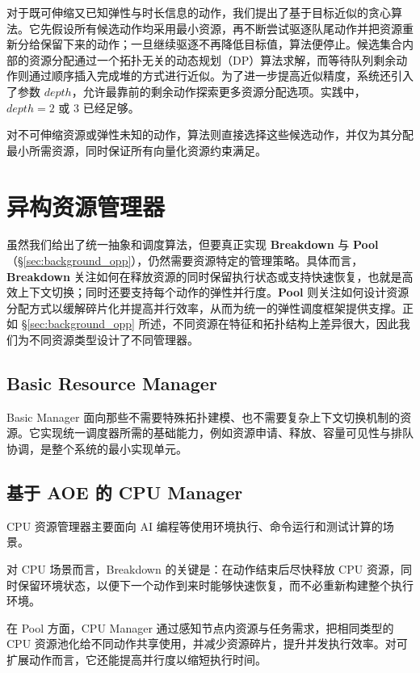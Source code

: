对于既可伸缩又已知弹性与时长信息的动作，我们提出了基于目标近似的贪心算法。它先假设所有候选动作均采用最小资源，再不断尝试驱逐队尾动作并把资源重新分给保留下来的动作；一旦继续驱逐不再降低目标值，算法便停止。候选集合内部的资源分配通过一个拓扑无关的动态规划（DP）算法求解，而等待队列剩余动作则通过顺序插入完成堆的方式进行近似。为了进一步提高近似精度，系统还引入了参数 $depth$，允许最靠前的剩余动作探索更多资源分配选项。实践中，$depth=2$ 或 $3$ 已经足够。

对不可伸缩资源或弹性未知的动作，算法则直接选择这些候选动作，并仅为其分配最小所需资源，同时保证所有向量化资源约束满足。

\section{异构资源管理器}
\label{sec:design_resource_managing}

虽然我们给出了统一抽象和调度算法，但要真正实现 \textbf{Breakdown} 与 \textbf{Pool}（\S\ref{sec:background_opp}），仍然需要资源特定的管理策略。具体而言，\textbf{Breakdown} 关注如何在释放资源的同时保留执行状态或支持快速恢复，也就是高效上下文切换；同时还要支持每个动作的弹性并行度。\textbf{Pool} 则关注如何设计资源分配方式以缓解碎片化并提高并行效率，从而为统一的弹性调度框架提供支撑。正如 \S\ref{sec:background_opp} 所述，不同资源在特征和拓扑结构上差异很大，因此我们为不同资源类型设计了不同管理器。

\subsection{Basic Resource Manager}
Basic Manager 面向那些不需要特殊拓扑建模、也不需要复杂上下文切换机制的资源。它实现统一调度器所需的基础能力，例如资源申请、释放、容量可见性与排队协调，是整个系统的最小实现单元。

\subsection{基于 AOE 的 CPU Manager}
CPU 资源管理器主要面向 AI 编程等使用环境执行、命令运行和测试计算的场景。

对 CPU 场景而言，Breakdown 的关键是：在动作结束后尽快释放 CPU 资源，同时保留环境状态，以便下一个动作到来时能够快速恢复，而不必重新构建整个执行环境。

在 Pool 方面，CPU Manager 通过感知节点内资源与任务需求，把相同类型的 CPU 资源池化给不同动作共享使用，并减少资源碎片，提升并发执行效率。对可扩展动作而言，它还能提高并行度以缩短执行时间。

